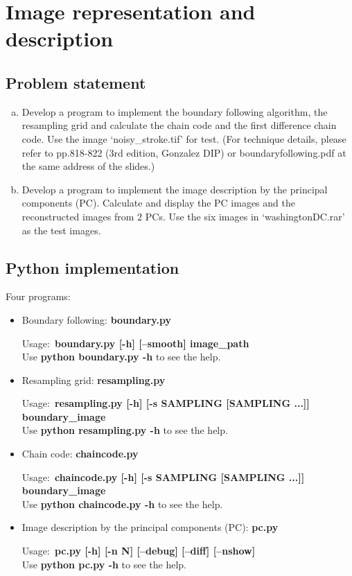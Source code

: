 \chapter{Image representation and description}

\section{Problem statement}

\begin{enumerate}[(a)]

    \item Develop a program to implement the boundary following
    algorithm, the resampling grid and calculate the chain code and
    the first difference chain code. Use the image ‘noisy\_stroke.tif’ for
    test. (For technique details, please refer to pp.818-822 (3rd
    edition, Gonzalez DIP) or boundaryfollowing.pdf at the same
    address of the slides.)

    \item Develop a program to implement the image description
    by the principal components (PC). Calculate and display the PC
    images and the reconstructed images from 2 PCs. Use the six
    images in ‘washingtonDC.rar’ as the test images.

\end{enumerate}

\section{Python implementation}
\bigskip
Four programs: \\
\begin{itemize}
    \item Boundary following: \textbf{boundary.py}

    Usage:~\textbf{boundary.py [-h] [--smooth] image\_path}\\
    Use \textbf{python boundary.py -h} to see the help.

    \bigskip
    \item Resampling grid: \textbf{resampling.py}

    Usage:~\textbf{resampling.py [-h] [-s SAMPLING [SAMPLING ...]] boundary\_image}\\
    Use \textbf{python resampling.py -h} to see the help.

    \bigskip
    \item Chain code: \textbf{chaincode.py}

    Usage:~\textbf{chaincode.py [-h] [-s SAMPLING [SAMPLING ...]] boundary\_image}\\
    Use \textbf{python chaincode.py -h} to see the help.

    \bigskip
    \item Image description by the principal components (PC): \textbf{pc.py}

    Usage:~\textbf{pc.py [-h] [-n N] [--debug] [--diff] [--nshow]}\\
    Use \textbf{python pc.py -h} to see the help.

\end{itemize}

